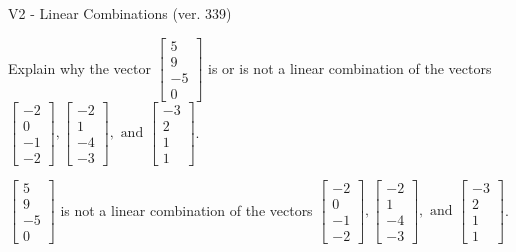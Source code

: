 \begin{exercise}
  \begin{exerciseTitle}V2 - Linear Combinations (ver. 339)\end{exerciseTitle}
  \begin{exerciseStatement}
    Explain why the vector \(\left[\begin{array}{c}
5 \\
9 \\
-5 \\
0
\end{array}\right]\)  is or is not a linear 
	combination of the vectors \(\left[\begin{array}{c}
-2 \\
0 \\
-1 \\
-2
\end{array}\right] , \left[\begin{array}{c}
-2 \\
1 \\
-4 \\
-3
\end{array}\right] , \text{ and } \left[\begin{array}{c}
-3 \\
2 \\
1 \\
1
\end{array}\right]\).
	


  \end{exerciseStatement}
  \begin{exerciseAnswer}
   \(\left[\begin{array}{c}
5 \\
9 \\
-5 \\
0
\end{array}\right]\) 
  	 is not  
	a linear combination of the vectors \(\left[\begin{array}{c}
-2 \\
0 \\
-1 \\
-2
\end{array}\right] , \left[\begin{array}{c}
-2 \\
1 \\
-4 \\
-3
\end{array}\right] , \text{ and } \left[\begin{array}{c}
-3 \\
2 \\
1 \\
1
\end{array}\right]\).

	
  


  \end{exerciseAnswer}
\end{exercise}